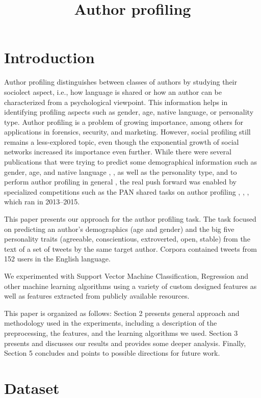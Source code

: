 \documentclass[10pt, a4paper]{article}
\title{ Author profiling}
\begin{document}
\maketitleabstract

\section{Introduction}

Author profiling distinguishes between classes of authors by studying their sociolect aspect, i.e., how language is shared or how an author can be characterized from a psychological viewpoint. This information helps in identifying profiling aspects such as gender, age, native language, or personality type. Author profiling is a problem of growing importance, among others for applications in forensics, security, and marketing. However, social profiling still remains a less-explored topic, even though the exponential growth of social networks increased its importance even further. While there were several publications that were trying to predict some demographical information such as gender, age, and native language \citep{argamon2003}, \citep{peersman2011}, as well as the personality type, and to perform author profiling in general \citep{argamon2009}, the real push forward was enabled by specialized competitions such as the PAN shared tasks on author profiling \citep{pardo2013}, \citep{rangel2014}, \citep{rangel2015}, which ran in 2013–2015. 

This paper presents our approach for the author profiling task. The task focused on predicting an author’s demographics (age and gender) and the big five personality traits \citep{mccrae2008} (agreeable, conscientious, extroverted, open, stable) from the text of a set of tweets by the same target author. Corpora contained tweets from 152 users in the English language.

 We experimented with Support Vector Machine Classification, Regression and other machine learning algorithms using a variety of custom designed features as well as features extracted from publicly available resources. 


This paper is organized as follows: Section 2 presents general approach and methodology used in the experiments, including a description of the preprocessing, the features, and the learning algorithms we used. Section 3 presents and discusses our results and provides some deeper analysis. Finally, Section 5 concludes and points to possible directions for future work.

\section{Dataset}
\end{document}
